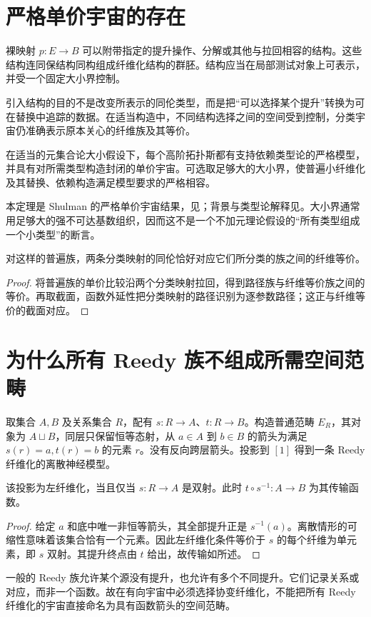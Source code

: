 \section{严格单价宇宙的存在}
\begin{definition}[带结构的纤维化]
裸映射 $p:E\to B$ 可以附带指定的提升操作、分解或其他与拉回相容的结构。这些结构连同保结构同构组成纤维化结构的群胚。结构应当在局部测试对象上可表示，并受一个固定大小界控制。
\end{definition}
\begin{remark}
引入结构的目的不是改变所表示的同伦类型，而是把“可以选择某个提升”转换为可在替换中追踪的数据。在适当构造中，不同结构选择之间的空间受到控制，分类宇宙仍准确表示原本关心的纤维族及其等价。
\end{remark}
\begin{theorem}
在适当的元集合论大小假设下，每个高阶拓扑斯都有支持依赖类型论的严格模型，并具有对所需类型构造封闭的单价宇宙。可选取足够大的大小界，使普遍小纤维化及其替换、依赖构造满足模型要求的严格相容。
\end{theorem}
\begin{remark}
本定理是 Shulman 的严格单价宇宙结果，见\cite{ShulmanUniverses}；背景与类型论解释见\cite{RiehlSemantics}。大小界通常用足够大的强不可达基数组织，因而这不是一个不加元理论假设的“所有类型组成一个小类型”的断言。
\end{remark}
\begin{proposition}[模型中的单价性含义]
对这样的普遍族，两条分类映射的同伦恰好对应它们所分类的族之间的纤维等价。
\end{proposition}
\begin{proof}
将普遍族的单价比较沿两个分类映射拉回，得到路径族与纤维等价族之间的等价。再取截面，函数外延性把分类映射的路径识别为逐参数路径；这正与纤维等价的截面对应。
\end{proof}

\section{为什么所有 Reedy 族不组成所需空间范畴}
\begin{example}[任意二部关系]
取集合 $A,B$ 及关系集合 $R$，配有 $s:R\to A$、$t:R\to B$。构造普通范畴 $E_R$，其对象为 $A\sqcup B$，同层只保留恒等态射，从 $a\in A$ 到 $b\in B$ 的箭头为满足 $s(r)=a,t(r)=b$ 的元素 $r$。没有反向跨层箭头。投影到 $[1]$ 得到一条 Reedy 纤维化的离散神经模型。
\end{example}
\begin{proposition}
该投影为左纤维化，当且仅当 $s:R\to A$ 是双射。此时 $t\circ s^{-1}:A\to B$ 为其传输函数。
\end{proposition}
\begin{proof}
给定 $a$ 和底中唯一非恒等箭头，其全部提升正是 $s^{-1}(a)$。离散情形的可缩性意味着该集合恰有一个元素。因此左纤维化条件等价于 $s$ 的每个纤维为单元素，即 $s$ 双射。其提升终点由 $t$ 给出，故传输如所述。
\end{proof}
\begin{remark}
一般的 Reedy 族允许某个源没有提升，也允许有多个不同提升。它们记录关系或对应，而非一个函数。故在有向宇宙中必须选择协变纤维化，不能把所有 Reedy 纤维化的宇宙直接命名为具有函数箭头的空间范畴。
\end{remark}

